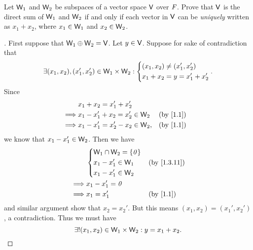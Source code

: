 \begin{ex}\label{ex:1.3.30}
  Let \(\mathsf{W}_1\) and \(\mathsf{W}_2\) be subspaces of a vector space \(\mathsf{V}\) over \(\mathit{F}\).
  Prove that \(\mathsf{V}\) is the direct sum of \(\mathsf{W}_1\) and \(\mathsf{W}_2\) if and only if each vector in \(\mathsf{V}\) can be \emph{uniquely} written as \(x_1 + x_2\), where \(x_1 \in \mathsf{W}_1\) and \(x_2 \in \mathsf{W}_2\).
\end{ex}

\begin{proof}[]
  First suppose that \(\mathsf{W}_1 \oplus \mathsf{W}_2 = \mathsf{V}\).
  Let \(y \in \mathsf{V}\).
  Suppose for sake of contradiction that
  \[
    \exists (x_1, x_2), (x_1', x_2') \in \mathsf{W}_1 \times \mathsf{W}_2 : \begin{dcases}
      (x_1, x_2) \neq (x_1', x_2') \\
      x_1 + x_2 = y = x_1' + x_2'
    \end{dcases}.
  \]
  Since
  \begin{align*}
             & x_1 + x_2 = x_1' + x_2'                                       \\
    \implies & x_1 - x_1' + x_2 = x_2' \in \W_2  &  & \text{(by \cref{1.1})} \\
    \implies & x_1 - x_1' = x_2' - x_2 \in \W_2, &  & \text{(by \cref{1.1})}
  \end{align*}
  we know that \(x_1 - x_1' \in \mathsf{W}_2\).
  Then we have
  \begin{align*}
             & \begin{dcases}
      \W_1 \cap \W_2 = \set{\zv} \\
      x_1 - x_1' \in \W_1        \\
      x_1 - x_1' \in \W_2
    \end{dcases} &  & \text{(by \cref{1.3.11})} \\
    \implies & x_1 - x_1' = \zv                                           \\
    \implies & x_1 = x_1'                  &  & \text{(by \cref{1.1})}
  \end{align*}
  and similar argument show that \(x_2 = x_2'\).
  But this means \((x_1, x_2) = (x_1', x_2')\), a contradiction.
  Thus we must have
  \[
    \exists! (x_1, x_2) \in \mathsf{W}_1 \times \mathsf{W}_2 : y = x_1 + x_2.
  \]


\end{proof}
